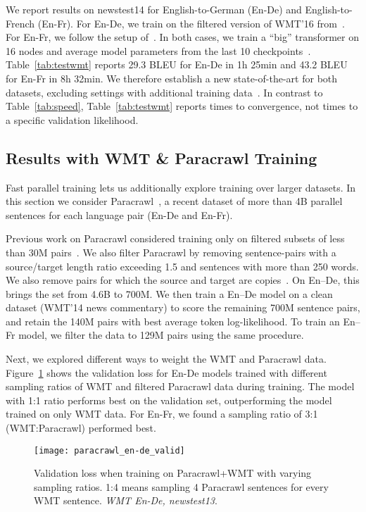 \documentclass[11pt,a4paper]{article}
\begin{document}
We report results on newstest14 for English-to-German (En-De) and English-to-French (En-Fr).
For En-De, we train on the filtered version of WMT'16 from~\citet{vaswani2017transformer}.
For En-Fr, we follow the setup of~\citet{gehring2017convs2s}.
In both cases, we train a ``big'' transformer on 16 nodes and average model parameters from the last 10 checkpoints~\citep{vaswani2017transformer}.
Table~\ref{tab:testwmt} reports 29.3 BLEU for En-De in 1h 25min and 43.2 BLEU for En-Fr in 8h 32min. We therefore establish a new state-of-the-art for both datasets, excluding settings with additional training data~\citep{deepl}. In contrast to Table~\ref{tab:speed}, Table~\ref{tab:testwmt} reports times to convergence, not times to a specific validation likelihood.

\subsection{Results with WMT \& Paracrawl Training}
\label{sec:paracrawl}

Fast parallel training lets us additionally explore training over larger datasets. In this section we consider Paracrawl~\citep{paracrawl}, a recent dataset of more than 4B parallel sentences for each language pair (En-De and En-Fr).

Previous work on Paracrawl considered training only on filtered subsets of less than 30M pairs~\cite{xu2017xipporah}. We also filter Paracrawl by removing sentence-pairs with a source/target length ratio exceeding 1.5 and sentences with more than 250 words. We also remove pairs for which the source and target are copies~\cite{ott:uncertainty:2018}. On En--De, this brings the set from 4.6B to 700M. We then train a En--De model on a clean dataset (WMT'14 news commentary) to score the remaining 700M sentence pairs, and retain the 140M pairs with best average token log-likelihood.
To train an En--Fr model, we filter the data to 129M pairs using the same procedure.

Next, we explored different ways to weight the WMT and Paracrawl data.
Figure~\ref{fig:paracrawl} shows the validation loss for En-De models trained with different sampling ratios of WMT and filtered Paracrawl data during training.
The model with 1:1 ratio performs best on the validation set, outperforming the model trained on only WMT data.
For En-Fr, we found a sampling ratio of 3:1 (WMT:Paracrawl) performed best.

\begin{figure}[t]
\centering
\texttt{[image: paracrawl\_en-de\_valid]}
\caption{Validation loss when training on Paracrawl+WMT with varying sampling ratios.
1:4 means sampling 4 Paracrawl sentences for every WMT sentence.
\emph{WMT En-De, newstest13}.}
\label{fig:paracrawl}
\end{figure}
\end{document}
